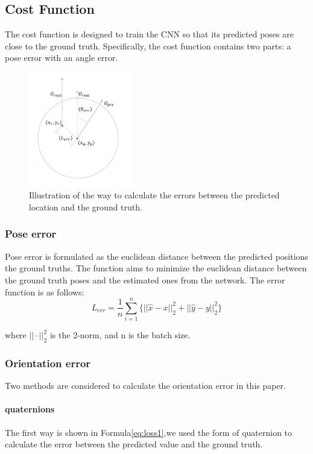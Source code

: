 \documentclass[journal]{IEEEtran}
\begin{document}
\subsection{Cost Function }

The cost function is designed to train the CNN so that its predicted poses are close to the ground truth. Specifically, the cost function contains two parts: a  pose error with an angle error.

\begin{figure}[h]
	\centering
	\includegraphics[width=0.4\textwidth]{cost.pdf}
	\caption{ Illustration of the way to calculate the errors between the predicted location and the ground truth.  }
	 \label{fig:cost}
\end{figure}

\subsubsection{Pose error }
 Pose error is formulated as the euclidean distance between the predicted positions the ground truths. The function aims to minimize the euclidean distance between the ground truth poses and the estimated ones from the network. The error function is as follows:
 \begin{equation}
 	L_{err}= \frac{1}{n}\sum_{i=1}^{n}\{||\hat{x}-x||^2_2+||\hat{y}-y||^2_2\}
 \end{equation}

where $|| \cdot ||^2_2 $ is the 2-norm,  and n is the batch size.


\subsubsection{Orientation error }
Two methods are considered to calculate the orientation error in this paper.
\paragraph{quaternions}
The first way is shown in Formula\ref{eq:loss1},we used the form of quaternion to calculate the error between the predicted value and the ground truth.
\end{document}
